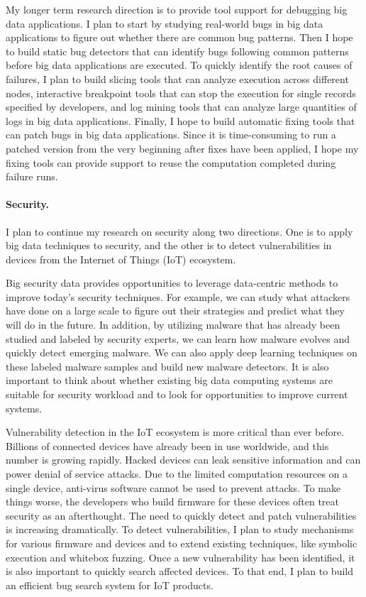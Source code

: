 \documentclass[10pt]{article}
\begin{document}
My longer term research direction is to provide tool support for debugging big data applications.
I plan to start by studying real-world bugs in big data applications to figure out whether there are common bug patterns. 
Then I hope to build static bug detectors that can identify bugs following common patterns before big data applications are executed.  
To quickly identify the root causes of failures, I plan to build slicing tools that can analyze execution across different nodes, 
interactive breakpoint tools that can stop the execution for single records specified by developers,
and log mining tools that can analyze large quantities of logs in big data applications.
Finally, I hope to build automatic fixing tools that can patch bugs in big data applications.
Since it is time-consuming to run a patched version from the very beginning after fixes have been applied, 
I hope my fixing tools can provide support to reuse the computation completed during failure runs.  


\vspace{-.1in}
\paragraph{Security.} 

I plan to continue my research on security along two directions. 
One is to apply big data techniques to security, 
and the other is to detect vulnerabilities in devices from the Internet of Things (IoT) ecosystem.

Big security data provides opportunities to leverage data-centric methods to improve today's security techniques. 
For example, we can study what attackers have done on a large scale to figure out their strategies and predict what they will do in the future. 
In addition, by utilizing malware that has already been studied and labeled by security experts, 
we can learn how malware evolves and quickly detect emerging malware. 
We can also apply deep learning techniques on these labeled malware samples and build new malware detectors. 
It is also important to think about whether existing big data computing systems are suitable for security workload
and to look for opportunities to improve current systems.

Vulnerability detection in the IoT ecosystem is more critical than ever before.
Billions of connected devices have already been in use worldwide, 
and this number is growing rapidly.  
Hacked devices can leak sensitive information and can power denial of service attacks. 
Due to the limited computation resources on a single device, 
anti-virus software cannot be used to prevent attacks. 
To make things worse, the developers who build firmware for these devices often treat security as an afterthought. 
The need to quickly detect and patch vulnerabilities is increasing dramatically. 
To detect vulnerabilities, I plan to study mechanisms for various firmware and devices 
and to extend existing techniques, like symbolic execution and whitebox fuzzing. 
Once a new vulnerability has been identified, it is also important to quickly search affected devices. 
To that end, I plan to build an efficient bug search system for IoT products.  


\newpage


\end{document}
